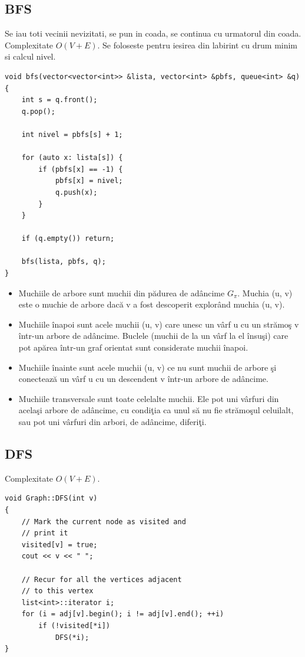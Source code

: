 \documentclass{article}
\begin{document}
    \subsection*{BFS} Se iau toti vecinii nevizitati, se pun in coada, se continua cu urmatorul din coada. Complexitate $O(V+E)$. Se foloseste pentru iesirea din labirint cu drum minim si calcul nivel.
    \begin{lstlisting}
void bfs(vector<vector<int>> &lista, vector<int> &pbfs, queue<int> &q) {
    int s = q.front();
    q.pop();

    int nivel = pbfs[s] + 1;

    for (auto x: lista[s]) {
        if (pbfs[x] == -1) {
            pbfs[x] = nivel;
            q.push(x);
        }
    }

    if (q.empty()) return;

    bfs(lista, pbfs, q);
}
    \end{lstlisting}

    \begin{itemize}
        \item Muchiile de arbore sunt muchii din pădurea de adâncime $G_\pi$. Muchia (u, v) este o muchie de arbore dacă v a fost descoperit explorând muchia (u, v).
        \item Muchiile înapoi sunt acele muchii (u, v) care unesc un vârf u cu un strămoş v într-un arbore de adâncime. Buclele (muchii de la un vârf la el însuşi) care pot apărea într-un graf orientat sunt considerate muchii înapoi.
        \item Muchiile înainte sunt acele muchii (u, v) ce nu sunt muchii de arbore şi conectează un vârf u cu un descendent v într-un arbore de adâncime.
        \item Muchiile transversale sunt toate celelalte muchii. Ele pot uni vârfuri din acelaşi arbore de adâncime, cu condiţia ca unul să nu fie strămoşul celuilalt, sau pot uni vârfuri din arbori, de adâncime, diferiţi.
    \end{itemize}

    \subsection*{DFS} Complexitate $O(V+E)$.
    \begin{lstlisting}
void Graph::DFS(int v)
{
    // Mark the current node as visited and
    // print it
    visited[v] = true;
    cout << v << " ";
 
    // Recur for all the vertices adjacent
    // to this vertex
    list<int>::iterator i;
    for (i = adj[v].begin(); i != adj[v].end(); ++i)
        if (!visited[*i])
            DFS(*i);
}
    \end{lstlisting}
\end{document}
